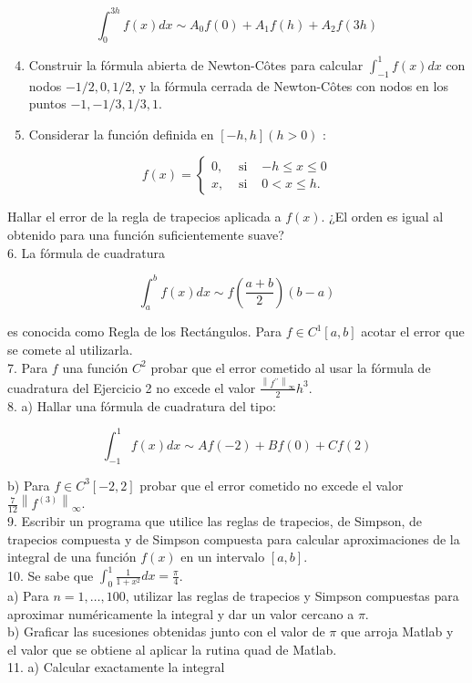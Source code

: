 \documentclass[10pt]{book}
\begin{document}
$$
\int_{0}^{3 h} f(x) d x \sim A_{0} f(0)+A_{1} f(h)+A_{2} f(3 h)
$$

\begin{enumerate}
  \setcounter{enumi}{3}
  \item Construir la fórmula abierta de Newton-Côtes para calcular $\int_{-1}^{1} f(x) d x$ con nodos $-1 / 2,0,1 / 2$, y la fórmula cerrada de Newton-Côtes con nodos en los puntos $-1,-1 / 3,1 / 3,1$.
  \item Considerar la función definida en $[-h, h](h>0)$ :
\end{enumerate}

$$
f(x)=\left\{\begin{array}{ccc}
0, & \text { si } & -h \leq x \leq 0 \\
x, & \text { si } & 0<x \leq h .
\end{array}\right.
$$

Hallar el error de la regla de trapecios aplicada a $f(x)$. ¿El orden es igual al obtenido para una función suficientemente suave?\\
6. La fórmula de cuadratura

$$
\int_{a}^{b} f(x) d x \sim f\left(\frac{a+b}{2}\right)(b-a)
$$

es conocida como Regla de los Rectángulos. Para $f \in C^{1}[a, b]$ acotar el error que se comete al utilizarla.\\
7. Para $f$ una función $C^{2}$ probar que el error cometido al usar la fórmula de cuadratura del Ejercicio 2 no excede el valor $\frac{\left\|f^{\prime \prime}\right\|_{\infty}}{2} h^{3}$.\\
8. a) Hallar una fórmula de cuadratura del tipo:

$$
\int_{-1}^{1} f(x) d x \sim A f(-2)+B f(0)+C f(2)
$$

b) Para $f \in C^{3}[-2,2]$ probar que el error cometido no excede el valor $\frac{7}{12}\left\|f^{(3)}\right\|_{\infty}$.\\
9. Escribir un programa que utilice las reglas de trapecios, de Simpson, de trapecios compuesta y de Simpson compuesta para calcular aproximaciones de la integral de una función $f(x)$ en un intervalo $[a, b]$.\\
10. Se sabe que $\int_{0}^{1} \frac{1}{1+x^{2}} d x=\frac{\pi}{4}$.\\
a) Para $n=1, \ldots, 100$, utilizar las reglas de trapecios y Simpson compuestas para aproximar numéricamente la integral y dar un valor cercano a $\pi$.\\
b) Graficar las sucesiones obtenidas junto con el valor de $\pi$ que arroja Matlab y el valor que se obtiene al aplicar la rutina quad de Matlab.\\
11. a) Calcular exactamente la integral
\end{document}
